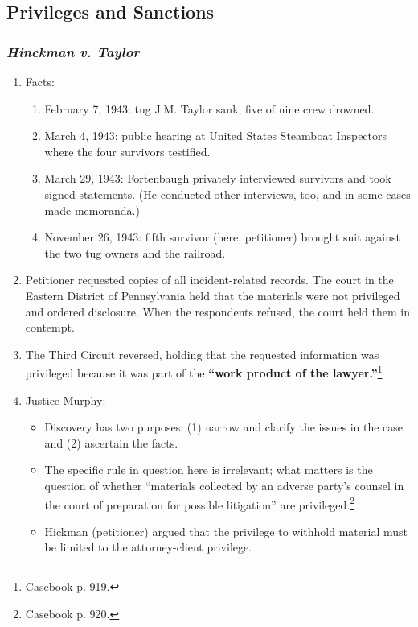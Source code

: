 \subsection{Privileges and Sanctions}

\subsubsection{\emph{Hinckman v. Taylor}}

\begin{enumerate}
    \item Facts:
    \begin{enumerate}
        \item February 7, 1943: tug J.M. Taylor sank; five of nine crew drowned.
        \item March 4, 1943: public hearing at United States Steamboat Inspectors where the four survivors testified.
        \item March 29, 1943: Fortenbaugh privately interviewed survivors and took signed statements. (He conducted other interviews, too, and in some cases made memoranda.)
        \item November 26, 1943: fifth survivor (here, petitioner) brought suit against the two tug owners and the railroad.
    \end{enumerate}
    \item Petitioner requested copies of all incident-related records. The court in the Eastern District of Pennsylvania held that the materials were not privileged and ordered disclosure. When the respondents refused, the court held them in contempt.
    \item The Third Circuit reversed, holding that the requested information was privileged because it was part of the \textbf{``work product of the lawyer.''}\footnote{Casebook p. 919.}
    \item Justice Murphy:
    \begin{itemize}
        \item Discovery has two purposes: (1) narrow and clarify the issues in the case and (2) ascertain the facts.
        \item The specific rule in question here is irrelevant; what matters is the question of whether ``materials collected by an adverse party's counsel in the court of preparation for possible litigation'' are privileged.\footnote{Casebook p. 920.}
        \item Hickman (petitioner) argued that the privilege to withhold material must be limited to the attorney-client privilege.

\end{itemize}
\end{enumerate}
